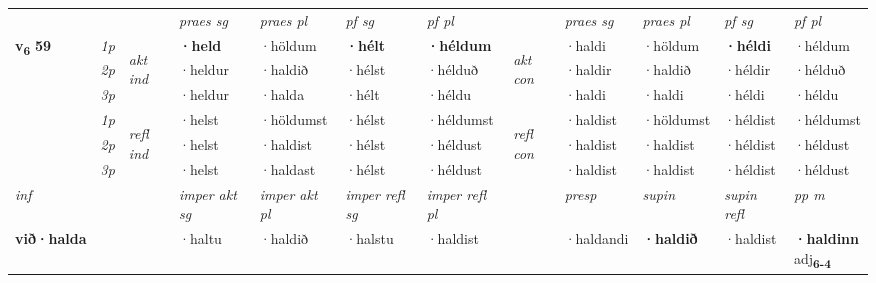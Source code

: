 \begin{longtable}[l]{X>{\footnotesize\itshape}llXXXXlXXXX}
\midrule

 & &   & \textit{praes sg}  & \textit{praes pl}    & \textit{ pf sg} & \textit{pf pl} & & \textit{praes sg}  & \textit{praes pl}    & \textit{pf sg} & \textit{pf pl }  \\ \cmidrule{4-7} \cmidrule{9-12}
 \multirow{2}{*}{{{\textbf{v{\textsubscript{6}}} \Large{\textbf{59}}}}}  & 1p & \multirow{3}{*}{\begin{turn}{90}\textit{akt ind}\end{turn}} & \textbf{·held} & ·höldum & \textbf{·hélt} & \textbf{·héldum} & \multirow{3}{*}{\begin{turn}{90}\textit{akt con}\end{turn}} &·haldi & ·höldum & \textbf{·héldi} & ·héldum\\*
 & 2p &  &  ·heldur  & ·haldið & ·hélst & ·hélduð & & ·haldir & ·haldið & ·héldir & ·hélduð \\*
 & 3p &  & ·heldur & ·halda & ·hélt & ·héldu & & ·haldi & ·haldi& ·héldi & ·héldu \\*
\cmidrule{4-7} \cmidrule{9-12}
 & 1p & \multirow{3}{*}{\begin{turn}{90}\textit{refl ind}\end{turn}}  & ·helst & ·höldumst & ·hélst & ·héldumst & \multirow{3}{*}{\begin{turn}{90}\textit{refl con}\end{turn}}  &·haldist & ·höldumst & ·héldist & ·héldumst \\*
 & 2p &  & ·helst & ·haldist & ·hélst & ·héldust & &·haldist & ·haldist & ·héldist & ·héldust \\*
 & 3p  & & ·helst & ·haldast & ·hélst & ·héldust & & ·haldist & ·haldist& ·héldist & ·héldust \\*
\cmidrule{4-7} \cmidrule{9-12}

   {\textit{inf}} & &  & \textit{imper akt sg} & \textit{imper akt pl} & \textit{imper refl sg} & \textit{imper refl pl} && \textit{presp} & \textit{supin} & \textit{supin refl} & \textit{pp m} \\*
  {\textbf{við\allowbreak ·halda}} & && ·haltu  & ·haldið & ·halstu & ·haldist && ·haldandi &  \textbf{·haldið} & ·haldist & \specialcell{\textbf{·haldinn} \\ adj\textbf{\textsubscript{6-4}}} \\*

\midrule


\end{longtable}
